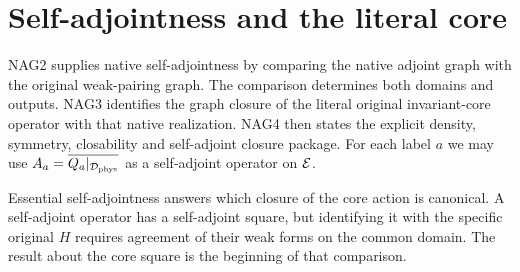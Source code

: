 \section{Self-adjointness and the literal core}
NAG2 supplies native self-adjointness by comparing the native adjoint graph with the original weak-pairing graph. The comparison determines both domains and outputs. NAG3 identifies the graph closure of the literal original invariant-core operator with that native realization. NAG4 then states the explicit density, symmetry, closability and self-adjoint closure package. For each label $a$ we may use $A_a=\overline{Q_a|_{\mathcal D_{\mathrm{phys}}}}$ as a self-adjoint operator on $\mathcal E$.

Essential self-adjointness answers which closure of the core action is canonical. A self-adjoint operator has a self-adjoint square, but identifying it with the specific original $H$ requires agreement of their weak forms on the common domain. The result about the core square is the beginning of that comparison.
